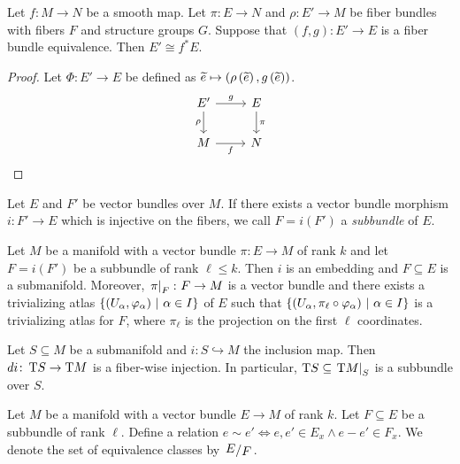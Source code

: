 \begin{trditev}
Let $f \colon M \to N$ be a smooth map. Let $\pi \colon E \to N$
and $\rho \colon E' \to M$ be fiber bundles with fibers $F$ and
structure groups $G$. Suppose that $(f, g) \colon E' \to E$ is a
fiber bundle equivalence. Then $E' \cong f^* E$.
\end{trditev}

\begin{proof}
Let $\Phi \colon E' \to E$ be defined as
$\widetilde{e} \mapsto
\left(\rho \left(\widetilde{e}\right), g \left(\widetilde{e}\right)\right)$.
\[
\begin{tikzcd}
E' \arrow[r, "g"] \arrow[d, "\rho"'] &
E \arrow[d, "\pi"] \\
M \arrow[r, "f"'] &
N
\end{tikzcd}
\]
\end{proof}

\begin{definicija}
Let $E$ and $F'$ be vector bundles over $M$. If there exists a
vector bundle morphism $i \colon F' \to E$ which is injective on
the fibers, we call $F = i(F')$ a \emph{subbundle}
of $E$.
\end{definicija}

\begin{trditev}
Let $M$ be a manifold with a vector bundle $\pi \colon E \to M$ of
rank $k$ and let $F = i(F')$ be a subbundle of rank $\ell \leq k$.
Then $i$ is an embedding and $F \subseteq E$ is a submanifold.
Moreover, $\left. \pi\right|_{F}^{} \colon F \to M$ is a vector bundle and
there exists a trivializing atlas
$\left\{(U_\alpha, \varphi_\alpha)~\middle\vert~\alpha \in I\right\}$ of $E$ such that
$\left\{(U_\alpha, \pi_\ell \circ \varphi_\alpha)~\middle\vert~\alpha \in I\right\}$ is
a trivializing atlas for $F$, where $\pi_\ell$ is the projection on
the first $\ell$ coordinates.
\end{trditev}

\begin{zgled}
Let $S \subseteq M$ be a submanifold and
$i \colon S \hookrightarrow M$ the inclusion map. Then
$di \colon \operatorname{T}\! S \to \operatorname{T}\! M$ is a fiber-wise injection. In
particular, $\operatorname{T}\! S \subseteq \left. \operatorname{T}\! M\right|_{S}^{}$ is a
subbundle over $S$.
\end{zgled}

\begin{definicija}
Let $M$ be a manifold with a vector bundle $E \to M$ of rank $k$.
Let $F \subseteq E$ be a subbundle of rank $\ell$. Define a
relation $e \sim e' \iff e, e' \in E_x \land e - e' \in F_x$. We
denote the set of equivalence classes by $\kvoc{E}{F}$.
\end{definicija}


